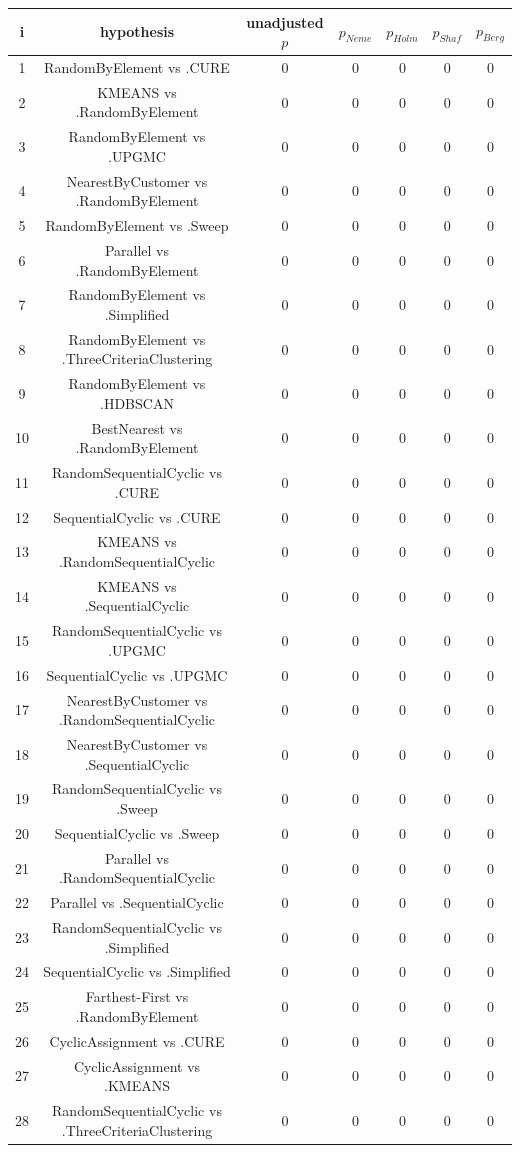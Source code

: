 \documentclass[a4paper,10pt]{article}
\begin{document}
\begin{landscape}
\begin{table}[!htp]
\centering\scriptsize
\begin{tabular}{ccccccc}
i&hypothesis&unadjusted $p$&$p_{Neme}$&$p_{Holm}$&$p_{Shaf}$&$p_{Berg}$\\
\hline1&RandomByElement vs .CURE&0&0&0&0&0\\
2&KMEANS vs .RandomByElement&0&0&0&0&0\\
3&RandomByElement vs .UPGMC&0&0&0&0&0\\
4&NearestByCustomer vs .RandomByElement&0&0&0&0&0\\
5&RandomByElement vs .Sweep&0&0&0&0&0\\
6&Parallel vs .RandomByElement&0&0&0&0&0\\
7&RandomByElement vs .Simplified&0&0&0&0&0\\
8&RandomByElement vs .ThreeCriteriaClustering&0&0&0&0&0\\
9&RandomByElement vs .HDBSCAN&0&0&0&0&0\\
10&BestNearest vs .RandomByElement&0&0&0&0&0\\
11&RandomSequentialCyclic vs .CURE&0&0&0&0&0\\
12&SequentialCyclic vs .CURE&0&0&0&0&0\\
13&KMEANS vs .RandomSequentialCyclic&0&0&0&0&0\\
14&KMEANS vs .SequentialCyclic&0&0&0&0&0\\
15&RandomSequentialCyclic vs .UPGMC&0&0&0&0&0\\
16&SequentialCyclic vs .UPGMC&0&0&0&0&0\\
17&NearestByCustomer vs .RandomSequentialCyclic&0&0&0&0&0\\
18&NearestByCustomer vs .SequentialCyclic&0&0&0&0&0\\
19&RandomSequentialCyclic vs .Sweep&0&0&0&0&0\\
20&SequentialCyclic vs .Sweep&0&0&0&0&0\\
21&Parallel vs .RandomSequentialCyclic&0&0&0&0&0\\
22&Parallel vs .SequentialCyclic&0&0&0&0&0\\
23&RandomSequentialCyclic vs .Simplified&0&0&0&0&0\\
24&SequentialCyclic vs .Simplified&0&0&0&0&0\\
25&Farthest-First vs .RandomByElement&0&0&0&0&0\\
26&CyclicAssignment vs .CURE&0&0&0&0&0\\
27&CyclicAssignment vs .KMEANS&0&0&0&0&0\\
28&RandomSequentialCyclic vs .ThreeCriteriaClustering&0&0&0&0&0\\

\end{tabular}
\end{table}
\end{landscape}
\end{document}
